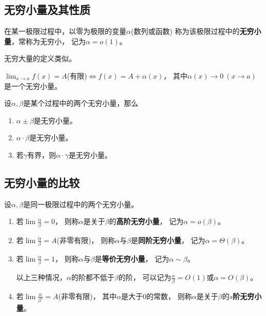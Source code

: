 \subsection{无穷小量及其性质}
\begin{definition}[无穷小量]
  在某一极限过程中，以零为极限的变量$\alpha$(数列或函数)
  称为该极限过程中的\textbf{无穷小量}，常称为无穷小，
  记为$\alpha=o(1)$。
\end{definition}
\begin{remark}
  无穷大量的定义类似。
\end{remark}

\begin{theorem}[无穷小量与极限]
  $\lim_{x\to a}f(x)=A$(有限)$\iff f(x)=A+\alpha(x)$，
  其中$\alpha(x)\to 0\ (x\to a)$是一个无穷小量。
\end{theorem}

\begin{theorem}[无穷小量的性质]
  设$\alpha,\beta$是某个过程中的两个无穷小量，那么
  \begin{enumerate}
    \item
    $\alpha\pm\beta$是无穷小量。
    \item
    $\alpha\cdot\beta$是无穷小量。
    \item
    若$\gamma$有界，则$\alpha\cdot\gamma$是无穷小量。
  \end{enumerate}
\end{theorem}

\subsection{无穷小量的比较}
\begin{definition}[无穷小量的比较]
  设$\alpha,\beta$是同一极限过程中的两个无穷小量。
  \begin{enumerate}
    \item
    若$\lim \frac{\alpha}{\beta}=0$，
    则称$\alpha$是关于$\beta$的\textbf{高阶无穷小量}，
    记为$\alpha = o(\beta)$。

    \item
    若$\lim \frac{\alpha}{\beta}=A$(非零有限)，
    则称$\alpha$与$\beta$是\textbf{同阶无穷小量}，
    记为$\alpha = \Theta(\beta)$。

    \item
    若$\lim \frac{\alpha}{\beta}=1$，
    则称$\alpha$与$\beta$是\textbf{等价无穷小量}，
    记为$\alpha \sim \beta$。

    以上三种情况，$\alpha$的阶都不低于$\beta$的阶，
    可以记为$\frac{\alpha}{\beta}=O(1)$或$\alpha=O(\beta)$。

    \item
    若$\lim \frac{\alpha}{\beta^s}=A$(非零有限)，
    其中$\alpha$是大于0的常数，
    则称$\alpha$是关于$\beta$的\textbf{$s$阶无穷小量}。
  \end{enumerate}
\end{definition}

